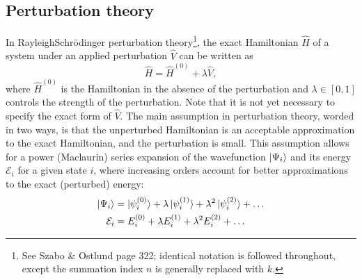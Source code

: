 \documentclass[%
class = book,%
crop = false,%
float = true,%
multi = true,%
preview = false,%
]{standalone}
\let\cite\autocite
\newcommand\schrod{Schr{\"{o}}dinger}
\begin{document}
\subsection{Perturbation theory}
\label{ssec:perturbation-theory}

In Rayleigh\textendash{}\schrod{} perturbation theory\footnote{See Szabo \& Ostlund\cite{szabo1989modern} page 322; identical notation is followed throughout, except the summation index \(n\) is generally replaced with \(k\).}, the exact Hamiltonian \(\hat{H}\) of a system under an applied perturbation \(\hat{V}\) can be written as
\begin{equation}
  \label{eq:perturbed-hamiltonian}
  \hat{H} = \hat{H}^{(0)} + \lambda\hat{V},
\end{equation}
where \(\hat{H}^{(0)}\) is the Hamiltonian in the absence of the perturbation and \(\lambda \in [0,1]\) controls the strength of the perturbation. Note that it is not yet necessary to specify the exact form of \(\hat{V}\). The main assumption in perturbation theory, worded in two ways, is that the unperturbed Hamiltonian is an acceptable approximation to the exact Hamiltonian, and the perturbation is small. This assumption allows for a power (Maclaurin) series expansion of the wavefunction \(\ket{\Psi_{i}}\) and its energy \(\mathcal{E}_{i}\) for a given state \(i\), where increasing orders account for better approximations to the exact (perturbed) energy:
\begin{align}
  \label{eq:expansion-wavefunction}
  \ket{\Psi_{i}} &= \ket{\psi_{i}^{(0)}} + \lambda\ket{\psi_{i}^{(1)}} + \lambda^{2}\ket{\psi_{i}^{(2)}} + \dots \\
  \label{eq:expansion-energy}
  \mathcal{E}_{i} &= E_{i}^{(0)} + \lambda E_{i}^{(1)} + \lambda^{2} E_{i}^{(2)} + \dots
\end{align}
\end{document}
